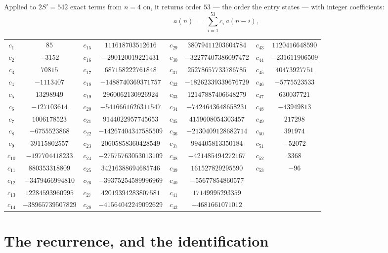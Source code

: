 \documentclass[11pt,a4paper]{article}
\theoremstyle{plain}
\theoremstyle{definition}
\begin{document}
Applied to $2S'=542$ exact terms from $n=4$ on, it returns order $53$ --- the
order the entry states --- with integer coefficients:
\[
a(n)\;=\;\sum_{i=1}^{53}c_i\,a(n-i),
\]
\begin{center}\small
\begin{tabular}{cccccccc}
$c_{1}$ & $85$ & $c_{15}$ & $111618703512616$ & $c_{29}$ & $38079411203604784$ & $c_{43}$ & $1120416648590$ \\
$c_{2}$ & $-3152$ & $c_{16}$ & $-290120019221431$ & $c_{30}$ & $-32277407386097472$ & $c_{44}$ & $-231611906509$ \\
$c_{3}$ & $70815$ & $c_{17}$ & $687158222761848$ & $c_{31}$ & $25278657733786785$ & $c_{45}$ & $40473927751$ \\
$c_{4}$ & $-1113407$ & $c_{18}$ & $-1488740369371757$ & $c_{32}$ & $-18262339339676729$ & $c_{46}$ & $-5775523533$ \\
$c_{5}$ & $13298949$ & $c_{19}$ & $2960062130926924$ & $c_{33}$ & $12147887406648279$ & $c_{47}$ & $630037721$ \\
$c_{6}$ & $-127103614$ & $c_{20}$ & $-5416661626311547$ & $c_{34}$ & $-7424643648658231$ & $c_{48}$ & $-43949813$ \\
$c_{7}$ & $1006178523$ & $c_{21}$ & $9144022957745653$ & $c_{35}$ & $4159608054303457$ & $c_{49}$ & $217298$ \\
$c_{8}$ & $-6755523868$ & $c_{22}$ & $-14267404347585509$ & $c_{36}$ & $-2130409128682714$ & $c_{50}$ & $391974$ \\
$c_{9}$ & $39115802557$ & $c_{23}$ & $20605858360428549$ & $c_{37}$ & $994405813350184$ & $c_{51}$ & $-52072$ \\
$c_{10}$ & $-197704418233$ & $c_{24}$ & $-27575763053013109$ & $c_{38}$ & $-421485494272167$ & $c_{52}$ & $3368$ \\
$c_{11}$ & $880353318809$ & $c_{25}$ & $34216388694685746$ & $c_{39}$ & $161527829295590$ & $c_{53}$ & $-96$ \\
$c_{12}$ & $-3479466994810$ & $c_{26}$ & $-39375254589996969$ & $c_{40}$ & $-55677854860577$ &  &  \\
$c_{13}$ & $12284593960995$ & $c_{27}$ & $42019394283807581$ & $c_{41}$ & $17149995293359$ &  &  \\
$c_{14}$ & $-38965739507829$ & $c_{28}$ & $-41564042249092629$ & $c_{42}$ & $-4681661071012$ &  &  \\
\end{tabular}
\end{center}

\section{The recurrence, and the identification}
\end{document}
